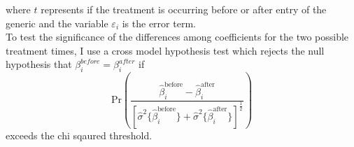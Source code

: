 where $t$ represents if the treatment is occurring before or after entry of the generic and the variable $\varepsilon_i$ is the error term.\\
\indent To test the significance of the differences among coefficients for the two possible treatment times, I use a cross model hypothesis test which rejects the null hypothesis that $\beta_i^{before} = \beta_i^{after}$ if 
\begin{equation}
\text{Pr}(\frac{\hat{\beta}^\text{before}_i - \hat{\beta}^\text{after}_i}{[\hat{\sigma}^2\{\hat{\beta}^\text{before}_i\} + \hat{\sigma}^2\{\hat{\beta}^\text{after}_i\}]^\frac{1}{2}})
\end{equation}
exceeds the chi sqaured threshold.\\